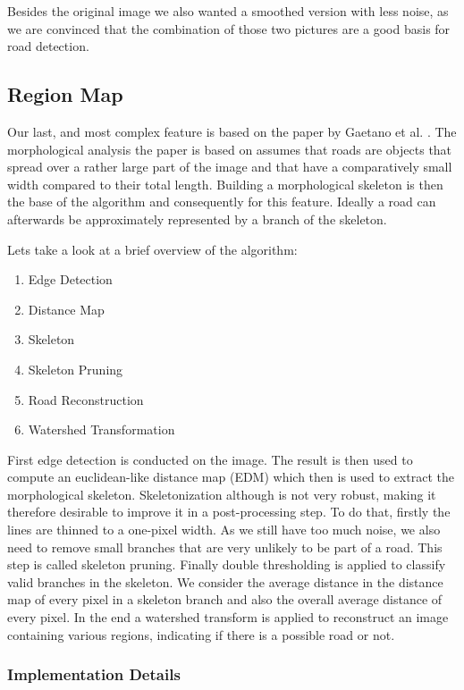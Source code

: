 \documentclass[10pt,conference,compsocconf]{IEEEtran}
\begin{document}
Besides the original image we also wanted a smoothed version with less noise, as we are convinced that the combination of those two pictures are a good basis for road detection.

\subsection{Region Map}
Our last, and most complex feature is based on the paper by Gaetano et al. \cite{GaZeScPo11}. The morphological analysis the paper is based on assumes that roads are objects that spread over a rather large part of the image and that have a comparatively small width compared to their total length. Building a morphological skeleton is then the base of the algorithm and consequently for this feature. Ideally a road can afterwards be approximately represented by a branch of the skeleton.

Lets take a look at a brief overview of the algorithm:
\begin{enumerate}
	\item Edge Detection
	\item Distance Map
	\item Skeleton
	\item Skeleton Pruning
	\item Road Reconstruction
	\item Watershed Transformation
\end{enumerate}
First edge detection is conducted on the image. The result is then used to compute an euclidean-like distance map (EDM) which then is used to extract the morphological skeleton. Skeletonization although is not very robust, making it therefore desirable to improve it in a post-processing step. To do that, firstly the lines are thinned to a one-pixel width. As we still have too much noise, we also need to remove small branches that are very unlikely to be part of a road. This step is called skeleton pruning. Finally double thresholding is applied to classify valid branches in the skeleton. We consider the average distance in the distance map of every pixel in a skeleton branch and also the overall average distance of every pixel. In the end a watershed transform is applied to reconstruct an image containing various regions, indicating if there is a possible road or not.

\subsubsection{Implementation Details} \hspace*{\fill}
\end{document}
